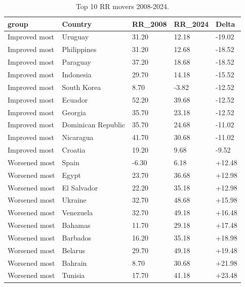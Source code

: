 \begin{table}

\caption{\label{tab:tab:basu_movers}Top 10 RR movers 2008-2024.}
\centering
\begin{tabular}[t]{lllll}
\toprule
group & Country & RR\_2008 & RR\_2024 & Delta\\
\midrule
Improved most & Uruguay & 31.20 & 12.18 & -19.02\\
Improved most & Philippines & 31.20 & 12.68 & -18.52\\
Improved most & Paraguay & 37.20 & 18.68 & -18.52\\
Improved most & Indonesia & 29.70 & 14.18 & -15.52\\
Improved most & South Korea & 8.70 & -3.82 & -12.52\\
\addlinespace
Improved most & Ecuador & 52.20 & 39.68 & -12.52\\
Improved most & Georgia & 35.70 & 23.18 & -12.52\\
Improved most & Dominican Republic & 35.70 & 24.68 & -11.02\\
Improved most & Nicaragua & 41.70 & 30.68 & -11.02\\
Improved most & Croatia & 19.20 & 9.68 & -9.52\\
\addlinespace
Worsened most & Spain & -6.30 & 6.18 & +12.48\\
Worsened most & Egypt & 23.70 & 36.68 & +12.98\\
Worsened most & El Salvador & 22.20 & 35.18 & +12.98\\
Worsened most & Ukraine & 32.70 & 48.68 & +15.98\\
Worsened most & Venezuela & 32.70 & 49.18 & +16.48\\
\addlinespace
Worsened most & Bahamas & 11.70 & 29.18 & +17.48\\
Worsened most & Barbados & 16.20 & 35.18 & +18.98\\
Worsened most & Belarus & 29.70 & 49.18 & +19.48\\
Worsened most & Bahrain & 8.70 & 30.68 & +21.98\\
Worsened most & Tunisia & 17.70 & 41.18 & +23.48\\
\bottomrule
\end{tabular}
\end{table}
